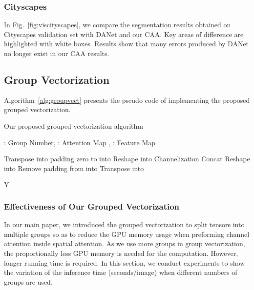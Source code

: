 \documentclass[letterpaper]{article} \usepackage{aaai22}  \usepackage{times}  \usepackage{helvet}  \usepackage{courier}  \usepackage[hyphens]{url}  \usepackage{graphicx} \urlstyle{rm} \def\UrlFont{\rm}  \usepackage{natbib}  \usepackage{caption} \DeclareCaptionStyle{ruled}{labelfont=normalfont,labelsep=colon,strut=off} \frenchspacing  \setlength{\pdfpagewidth}{8.5in}  \setlength{\pdfpageheight}{11in}  \usepackage{algorithm}
\begin{document}
\subsubsection{Cityscapes} In Fig.~\ref{fig:viscityscapes}, we compare the segmentation results obtained on Cityscapes validation set with DANet and our CAA. 
Key areas of difference are highlighted with white boxes. 
Results show that many errors produced by DANet no longer exist in our CAA results.



\subsection{Group Vectorization}

Algorithm~\ref{alg:groupvect} presents the pseudo code of implementing the proposed grouped vectorization. 

\begin{algorithm}[t]
    \small
    \setlength{\abovecaptionskip}{0.1cm}
    \setlength{\belowcaptionskip}{0.1cm}

    \caption{Our proposed grouped vectorization algorithm}

    \begin{algorithmic}[1]
        \Require : Group Number, : Attention Map , : Feature Map 
        
        \State 
        \State  Transpose  into 
        \State 
        \State  padding zero to   into 
        \State  Reshape  into 
        \For{}
            \State  Channelization 
        \EndFor
        \State  Concat
        \State  Reshape   into 
        \State  Remove padding from  into 
        \State  Transpose  into 
        
        \Return Y
    \end{algorithmic}
    \label{alg:groupvect}
\end{algorithm}

\subsubsection{Effectiveness of Our Grouped Vectorization}

In our main paper, we introduced the grouped vectorization to split tensors into multiple groups so as to reduce the GPU memory usage when preforming channel attention inside spatial attention.
As we use more groups in group vectorization, the proportionally less GPU memory is needed for the computation. 
However, longer running time is required.  
In this section, we conduct experiments to show the variation of the inference time (seconds/image) when different numbers of groups are used. 
\end{document}
